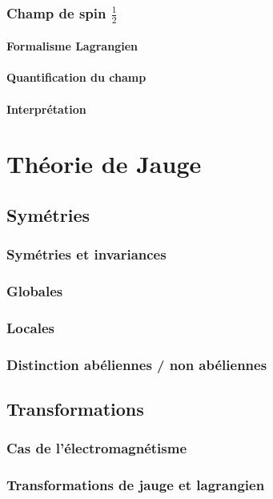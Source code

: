 \documentclass{article}
\newcommand{\inv}[1]{\frac{1}{#1}}
\begin{document}
			\subsubsection{Champ de spin $\inv2$}
				\paragraph{Formalisme Lagrangien}
				\paragraph{Quantification du champ}
				\paragraph{Interprétation}	
				
				
				
	
	\section{Théorie de Jauge}
		\subsection{Symétries}
			\subsubsection{Symétries et invariances}
			\subsubsection{Globales}
			\subsubsection{Locales}
			\subsubsection{Distinction abéliennes / non abéliennes}
			
		\subsection{Transformations}
			\subsubsection{Cas de l'électromagnétisme}
			\subsubsection{Transformations de jauge et lagrangien}
\end{document}
